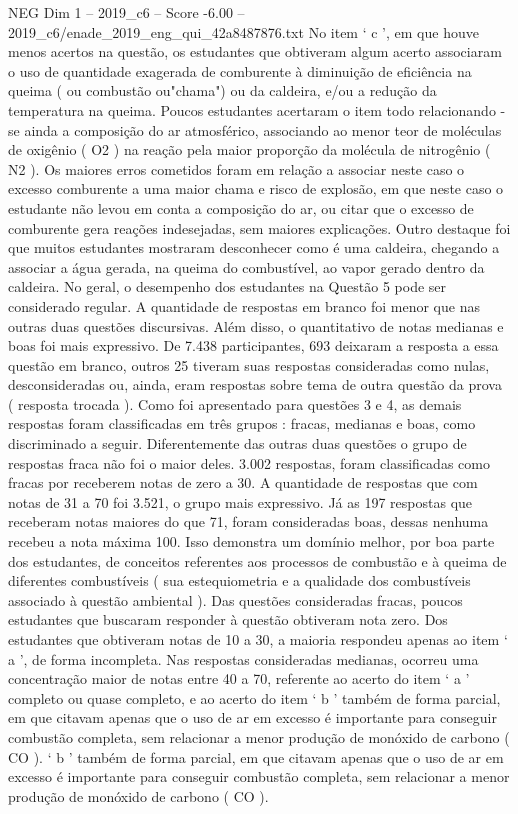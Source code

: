 \begin{textsample}{NEG Dim 1 – 2019\_c6 – Score -6.00 – 2019\_c6/enade\_2019\_eng\_qui\_42a8487876.txt}
No item ‘ c ’, em que houve menos acertos na questão, os estudantes que obtiveram algum acerto associaram o uso de quantidade exagerada de comburente à diminuição de eficiência na queima ( ou combustão ou"chama") ou da caldeira, e/ou a redução da temperatura na queima.
Poucos estudantes acertaram o item todo relacionando -se ainda a composição do ar atmosférico, associando ao menor teor de moléculas de oxigênio ( O2 ) na reação pela maior proporção da molécula de nitrogênio ( N2 ).
Os maiores erros cometidos foram em relação a associar neste caso o excesso comburente a uma maior chama e risco de explosão, em que neste caso o estudante não levou em conta a composição do ar, ou citar que o excesso de comburente gera reações indesejadas, sem maiores explicações.
Outro destaque foi que muitos estudantes mostraram desconhecer como é uma caldeira, chegando a associar a água gerada, na queima do combustível, ao vapor gerado dentro da caldeira.
No geral, o desempenho dos estudantes na Questão 5 pode ser considerado regular.
A quantidade de respostas em branco foi menor que nas outras duas questões discursivas.
Além disso, o quantitativo de notas medianas e boas foi mais expressivo.
De 7.438 participantes, 693 deixaram a resposta a essa questão em branco, outros 25 tiveram suas respostas consideradas como nulas, desconsideradas ou, ainda, eram respostas sobre tema de outra questão da prova ( resposta trocada ).
Como foi apresentado para questões 3 e 4, as demais respostas foram classificadas em três grupos : fracas, medianas e boas, como discriminado a seguir.
Diferentemente das outras duas questões o grupo de respostas fraca não foi o maior deles. 3.002 respostas, foram classificadas como fracas por receberem notas de zero a 30.
A quantidade de respostas que com notas de 31 a 70 foi 3.521, o grupo mais expressivo.
Já as 197 respostas que receberam notas maiores do que 71, foram consideradas boas, dessas nenhuma recebeu a nota máxima 100.
Isso demonstra um domínio melhor, por boa parte dos estudantes, de conceitos referentes aos processos de combustão e à queima de diferentes combustíveis ( sua estequiometria e a qualidade dos combustíveis associado à questão ambiental ).
Das questões consideradas fracas, poucos estudantes que buscaram responder à questão obtiveram nota zero.
Dos estudantes que obtiveram notas de 10 a 30, a maioria respondeu apenas ao item ‘ a ’, de forma incompleta.
Nas respostas consideradas medianas, ocorreu uma concentração maior de notas entre 40 a 70, referente ao acerto do item ‘ a ’ completo ou quase completo, e ao acerto do item ‘ b ’ também de forma parcial, em que citavam apenas que o uso de ar em excesso é importante para conseguir combustão completa, sem relacionar a menor produção de monóxido de carbono ( CO ). ‘ b ’ também de forma parcial, em que citavam apenas que o uso de ar em excesso é importante para conseguir combustão completa, sem relacionar a menor produção de monóxido de carbono ( CO ).

\end{textsample}
